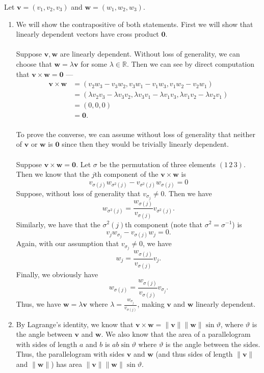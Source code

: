 \documentclass[12 pt, letterpaper]{hmcpset}
\begin{document}
\begin{solution}
	Let $\mathbf{v} = (v_1, v_2, v_3)$ and $\mathbf{w} = (w_1, w_2, w_3)$.
	\begin{enumerate}
		\item
			We will show the contrapositive of both statements. First we will show that linearly dependent vectors have cross product $\mathbf{0}$. \\\\
			Suppose $\mathbf{v}, \mathbf{w}$ are linearly dependent. Without loss of generality, we can choose that $\mathbf{w} = \lambda \mathbf{v}$ for some $\lambda \in \mathbb{R}$. Then we can see by direct computation that $\mathbf{v} \times \mathbf{w} = \mathbf{0}$ ---
			\[
				\begin{split}
					\mathbf{v} \times \mathbf{w} & = (v_2 w_3 - v_3 w_2, v_3 w_1 - v_1 w_3, v_1 w_2 - v_2 w_1) \\
								     & = (\lambda v_2 v_3 - \lambda v_3 v_2, \lambda v_3 v_1 - \lambda v_1 v_3, \lambda v_1 v_2 - \lambda v_2 v_1) \\
								     & = (0, 0, 0) \\
								     & = \mathbf{0}.
				\end{split}
			\] \\
			To prove the converse, we can assume without loss of generality that neither of $\mathbf{v}$ or $\mathbf{w}$ is $\mathbf{0}$ since then they would be trivially linearly dependent. \\\\
			Suppose $\mathbf{v} \times \mathbf{w} = \mathbf{0}$. Let $\sigma$ be the permutation of three elements $(1 \, 2 \, 3)$. Then we know that the $j$th component of the $\mathbf{v} \times \mathbf{w}$ is
			\[
				v_{\sigma(j)} w_{\sigma^2(j)} - v_{\sigma^2(j)} w_{\sigma(j)} = 0
			\]
			Suppose, without loss of generality that $v_{\sigma_j} \neq 0$. Then we have
			\[
				w_{\sigma^2(j)} = \frac{w_{\sigma(j)}}{v_{\sigma(j)}} v_{\sigma^2(j)}.
			\]
			Similarly, we have that the $\sigma^2(j)$th component (note that $\sigma^2 = \sigma^{-1}$) is
			\[
				v_j w_{\sigma_j} - v_{\sigma(j)} w_j = 0.
			\]
			Again, with our assumption that $v_{\sigma_j} \neq 0$, we have
			\[
				w_j = \frac{w_{\sigma(j)}}{v_{\sigma(j)}} v_j.
			\]
			Finally, we obviously have
			\[
				w_{\sigma(j)} = \frac{w_{\sigma(j)}}{v_{\sigma(j)}} v_{\sigma_j}.
			\]
			Thus, we have $\mathbf{w} = \lambda \mathbf{v}$ where $\lambda = \frac{w_{\sigma_j}}{v_{\sigma(j)}}$, making $\mathbf{v}$ and $\mathbf{w}$ linearly dependent.
		\item
			By Lagrange's identity, we know that $\mathbf{v} \times \mathbf{w} = \lVert \mathbf{v} \rVert \lVert \mathbf{w} \rVert \sin \vartheta$, where $\vartheta$ is the angle between $\mathbf{v}$ and $\mathbf{w}$. We also know that the area of a parallelogram with sides of length $a$ and $b$ is $ab \sin \vartheta$ where $\vartheta$ is the angle between the sides. Thus, the parallelogram with sides $\mathbf{v}$ and $\mathbf{w}$ (and thus sides of length $\lVert \mathbf{v} \rVert$ and $\lVert \mathbf{w} \rVert$) has area $\lVert \mathbf{v} \rVert \lVert \mathbf{w} \rVert \sin \vartheta$.
	\end{enumerate}
\end{solution}
\end{document}
